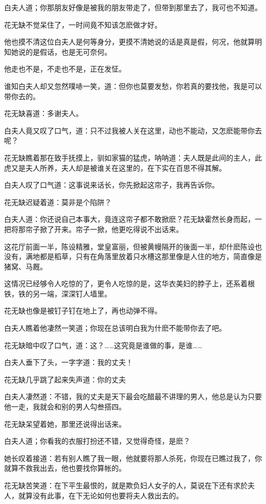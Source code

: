 \documentclass[12pt,oneside]{book}
\begin{document}
白夫人道；你那朋友好像是被我的朋友带走了，但带到那里去了，我可也不知道。

花无缺不觉呆住了，一时间竟不知该怎麽做才好。

他也摸不清这位白夫人是何等身分，更摸不清她说的话是真是假，何况，他就算明知她说的是假话，也是无可奈何。

他走也不是，不走也不是，正在发怔。

谁知白夫人却又忽然噗哧一笑，道：但你也莫要发愁，你若真的要找他，我是可以带你去的。

花无缺喜道：多谢夫人。

白夫人竟又叹了口气，道：只不过我被人关在这里，动也不能动，又怎麽能带你去呢？

花无缺瞧着那在致手抚摸上，驯如家猫的猛虎，呐呐道：夫人既是此间的主人，此虎又是夫人所养，夫人却是被谁关在这里的，在下实在百思不得其解。

白夫人叹了口气道：这事说来话长，你先掀起这帘子，我再告诉你。

花无缺迟疑着道：莫非是个陷阱？

白夫人道：你还说自己本事大，竟连这帘子都不敢掀麽？花无缺霍然长身而起，一把将那帘子掀了开来。帘子一掀，他更吃得说不出话来。

这花厅前面一半，陈设精雅，堂皇富丽，但被黄幔隔开的後面一半，却什麽陈设也没有，满地都是稻草，只有在角落里放着只水槽这那里像是人住的地方，简直像是猪窝、马厩。

这情况已经够令人吃惊的了，更令人吃惊的是，这华衣美妇的脖子上，还系着根铁，铁的另一端，深深钉人墙里。

花无缺也像是被钉子钉在地上了，再也动弹不得。

白夫人瞧着他凄然一笑道；你现在总该明白我为什麽不能带你去了吧。

花无缺暗中叹了口气，道：这？\ldots\ldots 这究竟是谁做的事，是谁\ldots\ldots{}

白夫人垂下了头，一字字道：我的丈夫！

花无缺几乎跳了起来失声道：你的丈夫

白夫人凄然道：不错，我的丈夫是天下最会吃醋最不讲理的男人，他总是认为只要他一走，我就会和别的男人勾叁搭四。

花无缺呆望着她，那里还说得出话来。

白夫人道；你看我的衣服打扮还不错，又觉得奇怪，是麽？

她长叹着接道：若有别人瞧了我一眼，他就要将那人杀死，你现在已瞧过我了，你就算不救我出去，他也要找你算帐的。

花无缺苦笑道：在下平生最恨的，就是欺负妇人女子的人，莫说在下还有求於夫人，就算没有此事，在下无论如何也要将夫人救出去的。
\end{document}
